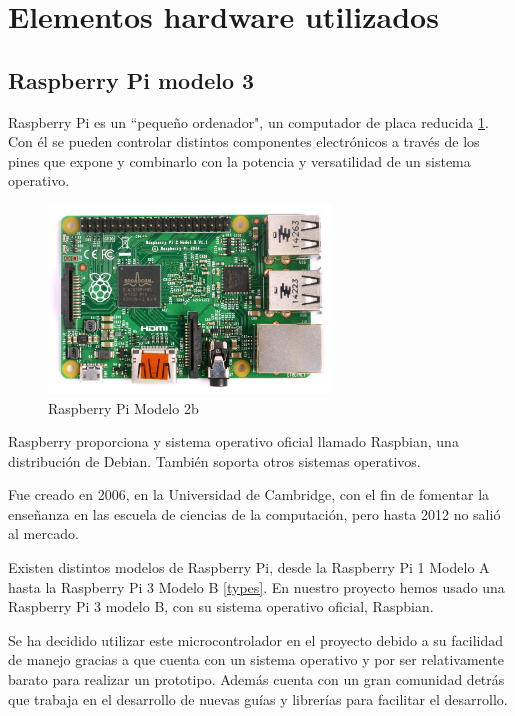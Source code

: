 \section{Elementos hardware utilizados}
\label{makereference4.2}

\subsection*{Raspberry Pi modelo 3}

Raspberry Pi  es un ``pequeño ordenador", un computador de placa reducida \ref{rasp}. Con él se pueden controlar distintos componentes electrónicos a través de los pines que expone y combinarlo con la potencia y versatilidad de un sistema operativo.

\begin{figure}[htb]
	\begin{center}
		\includegraphics[height=5cm]{figures/Raspberry_Pi.jpg}
		\caption{Raspberry Pi Modelo 2b}
	\end{center}
	
	\label{rasp}
\end{figure}

Raspberry proporciona y sistema operativo oficial llamado Raspbian, una distribución de Debian. También soporta otros sistemas operativos.
 
Fue creado en 2006, en la Universidad de Cambridge, con el fin de fomentar la enseñanza en las escuela de ciencias de la computación, pero hasta 2012 no salió al mercado.

Existen distintos modelos de Raspberry Pi, desde la Raspberry Pi 1 Modelo A hasta la Raspberry Pi 3 Modelo B \ref{types}.
En nuestro proyecto hemos usado una Raspberry Pi 3 modelo B, con su sistema operativo oficial, Raspbian.

Se ha decidido utilizar este microcontrolador en el proyecto debido a su facilidad de manejo gracias a que cuenta con un sistema operativo y por ser relativamente barato para realizar un prototipo. Además cuenta con un gran comunidad detrás que trabaja en el desarrollo de nuevas guías y librerías para facilitar el desarrollo. 

